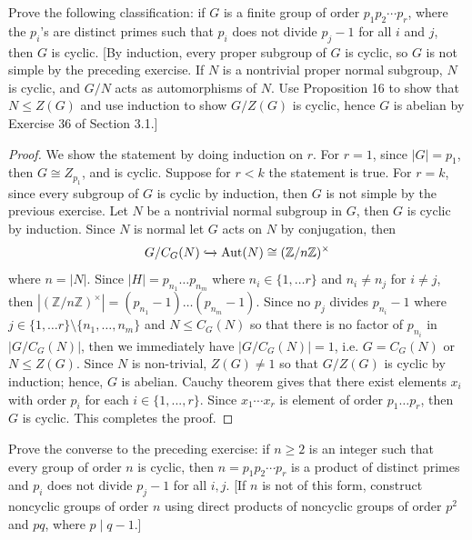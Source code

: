 \documentclass{article}
\newcommand{\Z}{\mathbb{Z}}
\newenvironment{problem}[2][Problem]{\begin{trivlist}
\item[\hskip \labelsep {\bfseries #1}\hskip \labelsep {\bfseries #2.}]}{\end{trivlist}}
\DeclareMathOperator{\Aut}{Aut}
\begin{document}
\begin{problem}{54}
    Prove the following classification: if $G$ is a finite group of order $p_1 p_2 \cdots p_r$, where the $p_i$'s are distinct primes such that $p_i$ does not divide $p_j - 1$ for all $i$ and $j$, 
    then $G$ is cyclic. 
    [By induction, every proper subgroup of $G$ is cyclic, so $G$ is not simple by the preceding exercise. 
    If $N$ is a nontrivial proper normal subgroup, $N$ is cyclic, and $G/N$ acts as automorphisms of $N$. 
    Use Proposition 16 to show that $N \leq Z(G)$ and use induction to show $G/Z(G)$ is cyclic, hence $G$ is abelian by Exercise 36 of Section 3.1.]
\end{problem}
\begin{proof}
    We show the statement by doing induction on $r$. For $r=1$, since $|G|=p_1$, then $G\cong Z_{p_1}$, and is cyclic. Suppose for $r<k$ the statement is true. For $r=k$, since every subgroup of $G$ is cyclic by induction, then $G$ is not simple by the previous exercise. Let $N$ be a nontrivial normal subgroup in $G$, then $G$ is cyclic by induction. Since $N$ is normal let $G$ acts on $N$ by conjugation, then 
    \[
        G/C_G(N) \xhookrightarrow{} \Aut(N) \cong (\Z/n\Z)^{\times}
    \]
    where $n=|N|$. Since $|H|=p_{n_1}\dots p_{n_m}$ where $n_i\in \{1, \dots r\}$ and $n_i\neq n_j$ for $i\neq j$, then $|(\Z/n\Z)^{\times}|=(p_{n_1}-1)\dots (p_{n_m}-1)$. Since no $p_j$ divides $p_{n_i}-1$ where $j\in \{1, \dots r\} \setminus \{n_1, \dots ,n_m\}$ and $N\leq C_G(N)$ so that there is no factor of $p_{n_i}$ in $|G/C_G(N)|$, then we immediately have $|G/C_G(N)|=1$, i.e. $G=C_G(N)$ or $N\leq Z(G)$. Since $N$ is non-trivial, $Z(G)\neq 1$ so that $G/Z(G)$ is cyclic by induction; hence, $G$ is abelian. Cauchy theorem gives that there exist elements $x_i$ with order $p_i$ for each $i\in \{1, ..., r\}$. Since $x_1\cdots x_r$ is element of order $p_1\dots p_r$, then $G$ is cyclic. This completes the proof.
\end{proof}
\begin{problem}{55}
     Prove the converse to the preceding exercise: if $n \geq 2$ is an integer such that every group of order $n$ is cyclic, 
    then $n = p_1 p_2 \cdots p_r$ is a product of distinct primes and $p_i$ does not divide $p_j - 1$ for all $i, j$. 
    [If $n$ is not of this form, construct noncyclic groups of order $n$ using direct products of noncyclic groups of order $p^2$ and $pq$, where $p \mid q - 1$.]
\end{problem}
\end{document}
